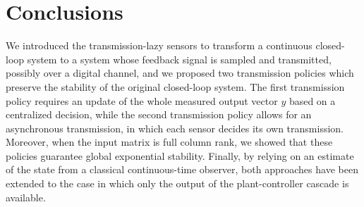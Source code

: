 \documentclass[twocolumn]{autart}
\begin{document}
\section{Conclusions}
\label{sec:conclusions}
We introduced the transmission-lazy sensors to transform a continuous closed-loop system
to a system whose feedback signal is sampled and transmitted, possibly over a 
{ digital channel},
and we proposed two transmission policies which preserve the stability of 
the original closed-loop system. The first transmission policy requires an
update of the whole measured output vector $y$ based on a centralized decision,
while the second transmission policy allows for an asynchronous transmission,
in which each sensor decides its own transmission. Moreover, when the input matrix 
is full column rank, we showed that these policies guarantee global exponential stability.
Finally, by relying on an estimate of the state
from a classical continuous-time observer, 
both approaches have been extended to the case in which only the output 
of the plant-controller cascade is available.




\linespread{0.9}
\end{document}
